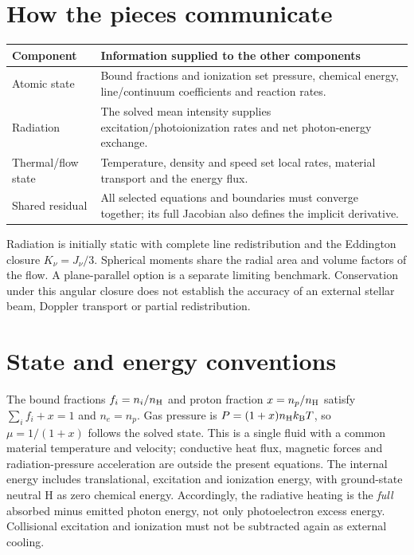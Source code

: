 \documentclass[11pt,a4paper]{article}
\begin{document}
\section{How the pieces communicate}
\begin{center}
\begin{tabular}{@{}p{}p{}@{}}
\toprule
Component & Information supplied to the other components\\
\midrule
Atomic state & Bound fractions and ionization set pressure, chemical energy,
line/continuum coefficients and reaction rates.\\
Radiation & The solved mean intensity supplies excitation/photoionization rates
and net photon-energy exchange.\\
Thermal/flow state & Temperature, density and speed set local rates, material
transport and the energy flux.\\
Shared residual & All selected equations and boundaries must converge together;
its full Jacobian also defines the implicit derivative.\\
\bottomrule
\end{tabular}
\end{center}
Radiation is initially static with complete line redistribution and the
Eddington closure $K_\nu=J_\nu/3$. Spherical moments share the radial area and
volume factors of the flow. A plane-parallel option is a separate limiting
benchmark. Conservation under this angular closure does not establish the
accuracy of an external stellar beam, Doppler transport or partial redistribution.

\section{State and energy conventions}
The bound fractions $f_i=n_i/n_{\rm H}$ and proton fraction $x=n_p/n_{\rm H}$
satisfy $\sum_i f_i+x=1$ and $n_e=n_p$. Gas pressure is
$P=(1+x)n_{\rm H}k_{\rm B}T$, so $\mu=1/(1+x)$ follows the solved state.
This is a single fluid with a common material temperature and velocity;
conductive heat flux, magnetic forces and radiation-pressure acceleration are
outside the present equations.
The internal energy includes translational, excitation and ionization energy,
with ground-state neutral H as zero chemical energy. Accordingly, the radiative
heating is the \emph{full} absorbed minus emitted photon energy, not only
photoelectron excess energy. Collisional excitation and ionization must not be
subtracted again as external cooling.
\end{document}
